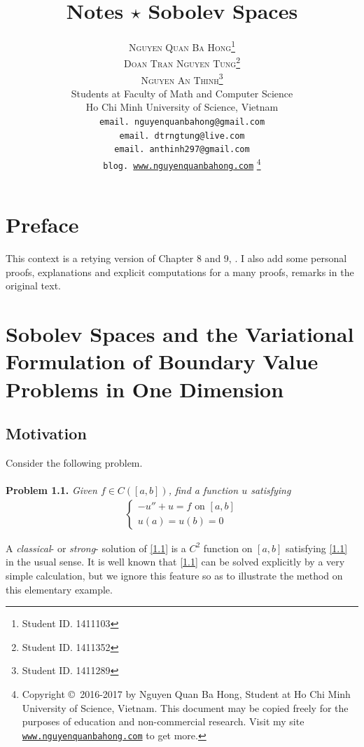 \documentclass[a4paper,oneside]{book}
\title{\Huge Notes $\star$ Sobolev Spaces}
\author{\textsc{Nguyen Quan Ba Hong}\footnote{Student ID. 1411103}\\
\textsc{Doan Tran Nguyen Tung}\footnote{Student ID. 1411352}\\
\textsc{Nguyen An Thinh}\footnote{Student ID. 1411289}\\
{\small Students at Faculty of Math and Computer Science}\\ 
{\small Ho Chi Minh University of Science, Vietnam} \\
{\small \texttt{email. nguyenquanbahong@gmail.com}}\\
{\small \texttt{email. dtrngtung@live.com}}\\
{\small \texttt{email. anthinh297@gmail.com}}\\
{\small \texttt{blog. \url{www.nguyenquanbahong.com}} 
\footnote{Copyright \copyright\ 2016-2017 by Nguyen Quan Ba Hong, Student at Ho Chi Minh University of Science, Vietnam. This document may be copied freely for the purposes of education and non-commercial research. Visit my site \texttt{\url{www.nguyenquanbahong.com}} to get more.}}}
\numberwithin{equation}{chapter}
\begin{document}
\frontmatter
\maketitle
\tableofcontents
\chapter*{Preface}
This context is a retying version of Chapter 8 and 9, \cite{1}. I also add some personal proofs, explanations and explicit computations for a many proofs, remarks in the original text.
\mainmatter
\chapter{Sobolev Spaces and the Variational Formulation of Boundary Value Problems in One Dimension}
\section{Motivation}
Consider the following problem.\\
\\
\textbf{Problem 1.1.} \textit{Given $f\in C\left(\left[a,b\right]\right)$, find a function $u$ satisfying}
\begin{align}
\label{1.1}
\left\{ \begin{array}{l}
 - u'' + u = f\mbox{ on } \left[ {a,b} \right]\\
u\left( a \right) = u\left( b \right) = 0
\end{array} \right.
\end{align}

A \textit{classical}- or \textit{strong}- solution of \eqref{1.1} is a $C^2$ function on $\left[a,b\right]$ satisfying \eqref{1.1} in the usual sense. It is well known that \eqref{1.1} can be solved explicitly by a very simple calculation, but we ignore this feature so as to illustrate the method on this elementary example.
\end{document}
